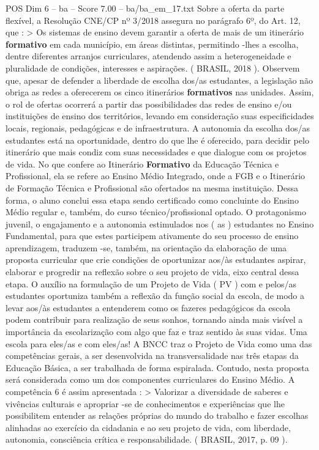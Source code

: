 \begin{textsample}{POS Dim 6 – ba – Score 7.00 – ba/ba\_em\_17.txt}
Sobre a oferta da parte flexível, a Resolução CNE/CP nº 3/2018 assegura no parágrafo 6º, do Art. 12, que : > Os sistemas de ensino devem garantir a oferta de mais de um itinerário \textbf{formativo} em cada município, em áreas distintas, permitindo -lhes a escolha, dentre diferentes arranjos curriculares, atendendo assim a heterogeneidade e pluralidade de condições, interesses e aspirações. ( BRASIL, 2018 ).
Observem que, apesar de defender a liberdade de escolha dos/as estudantes, a legislação não obriga as redes a oferecerem os cinco itinerários \textbf{formativos} nas unidades.
Assim, o rol de ofertas ocorrerá a partir das possibilidades das redes de ensino e/ou instituições de ensino dos territórios, levando em consideração suas especificidades locais, regionais, pedagógicas e de infraestrutura.
A autonomia da escolha dos/as estudantes está na oportunidade, dentro do que lhe é oferecido, para decidir pelo itinerário que mais condiz com suas necessidades e que dialogue com os projetos de vida.
No que confere ao Itinerário \textbf{Formativo} da Educação Técnica e Profissional, ela se refere ao Ensino Médio Integrado, onde a FGB e o Itinerário de Formação Técnica e Profissional são ofertados na mesma instituição.
Dessa forma, o aluno conclui essa etapa sendo certificado como concluinte do Ensino Médio regular e, também, do curso técnico/profissional optado.
O protagonismo juvenil, o engajamento e a autonomia estimulados nos ( as ) estudantes no Ensino Fundamental, para que estes participem ativamente do seu processo de ensino aprendizagem, traduzem -se, também, na orientação da elaboração de uma proposta curricular que crie condições de oportunizar aos/às estudantes aspirar, elaborar e progredir na reflexão sobre o seu projeto de vida, eixo central dessa etapa.
O auxílio na formulação de um Projeto de Vida ( PV ) com e pelos/as estudantes oportuniza também a reflexão da função social da escola, de modo a levar aos/às estudantes a entenderem como os fazeres pedagógicos da escola podem contribuir para realização de seus sonhos, tornando ainda mais visível a importância da escolarização com algo que faz e traz sentido às suas vidas.
Uma escola para eles/as e com eles/as!
A BNCC traz o Projeto de Vida como uma das competências gerais, a ser desenvolvida na transversalidade nas três etapas da Educação Básica, a ser trabalhada de forma espiralada.
Contudo, nesta proposta será considerada como um dos componentes curriculares do Ensino Médio.
A competência 6 é assim apresentada : > Valorizar a diversidade de saberes e vivências culturais e apropriar -se de conhecimentos e experiências que lhe possibilitem entender as relações próprias do mundo do trabalho e fazer escolhas alinhadas ao exercício da cidadania e ao seu projeto de vida, com liberdade, autonomia, consciência crítica e responsabilidade. ( BRASIL, 2017, p. 09 ).

\end{textsample}
